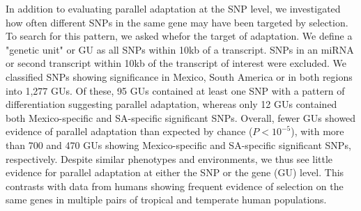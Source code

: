{{%
%
In addition to evaluating parallel adaptation at the SNP level, we investigated how often different SNPs in the same gene may have been targeted by selection. To search for this pattern, we asked whefor the target of adaptation. 
We define a "genetic unit" or GU as all SNPs within 10kb of a transcript.  SNPs in an miRNA or second transcript within 10kb of the transcript of interest were excluded.  
We classified SNPs showing significance in Mexico, South America or in both regions into 1,277 GUs. 
Of these, 95 GUs contained at least one SNP with a pattern of differentiation suggesting parallel adaptation, whereas only 12 GUs contained both Mexico-specific and SA-specific significant SNPs. 
Overall, fewer GUs showed evidence of parallel adaptation than expected by chance ($P<10^{-5}$), with more than 700 and 470 GUs showing Mexico-specific and SA-specific significant SNPs, respectively.  
Despite similar phenotypes and environments, we thus see little evidence for parallel adaptation at either the SNP or the gene (GU) level.  
This contrasts with data from humans \cite{Tennessen_2011_21698142} showing frequent evidence of selection on the same genes in multiple pairs of tropical and temperate human populations.  





}}
